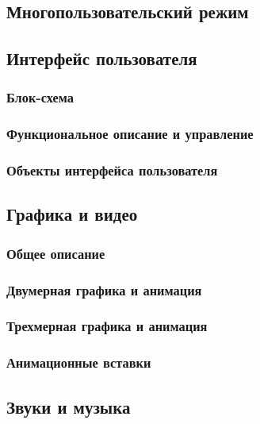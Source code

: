 \documentclass{article}
\begin{document}
\subsection{Многопользовательский режим}

\subsection{Интерфейс пользователя}

\subsubsection{Блок-схема}

\subsubsection{Функциональное описание и управление}

\subsubsection{Объекты интерфейса пользователя}

\subsection{Графика и видео}

\subsubsection{Общее описание}

\subsubsection{Двумерная графика и анимация}

\subsubsection{Трехмерная графика и анимация}

\subsubsection{Анимационные вставки}

\subsection{Звуки и музыка}
\end{document}
